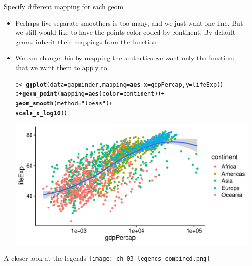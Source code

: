 \documentclass[10pt,handout]{beamer}\usepackage[]{graphicx}\usepackage[]{color}
\makeatletter
\def\maxwidth{ %
  \ifdim\Gin@nat@width>\linewidth
    \linewidth
  \else
    \Gin@nat@width
  \fi
}
\newcommand{\hlstr}[1]{\textcolor[rgb]{0.192,0.494,0.8}{#1}}%
\newcommand{\hlopt}[1]{\textcolor[rgb]{0,0,0}{#1}}%
\newcommand{\hlstd}[1]{\textcolor[rgb]{0.345,0.345,0.345}{#1}}%
\newcommand{\hlkwb}[1]{\textcolor[rgb]{0.69,0.353,0.396}{#1}}%
\newcommand{\hlkwc}[1]{\textcolor[rgb]{0.333,0.667,0.333}{#1}}%
\newcommand{\hlkwd}[1]{\textcolor[rgb]{0.737,0.353,0.396}{\textbf{#1}}}%
\newenvironment{kframe}{%
 \def\at@end@of@kframe{}%
 \ifinner\ifhmode%
  \def\at@end@of@kframe{\end{minipage}}%
  \begin{minipage}{\columnwidth}%
 \fi\fi%
 \def\FrameCommand##1{\hskip\@totalleftmargin \hskip-\fboxsep
 \colorbox{shadecolor}{##1}\hskip-\fboxsep
     \hskip-\linewidth \hskip-\@totalleftmargin \hskip\columnwidth}%
 \MakeFramed {\advance\hsize-\width
   \@totalleftmargin\z@ \linewidth\hsize
   \@setminipage}}%
 {\par\unskip\endMakeFramed%
 \at@end@of@kframe}
\newenvironment{knitrout}{}{} %
\makeatother
\begin{document}
\begin{frame}[fragile]{Specify different mapping for each geom}
	\small
	\begin{itemize}
		\item Perhaps five separate smoothers is too many, and we just want one line. But we still would like to have the points color-coded by continent. By default, geoms inherit their mappings from the  function \pause
		\item We can change this by mapping the aesthetics we want only the  functions that we want them to apply to.\pause
\begin{knitrout}\tiny
{}\color{fgcolor}\begin{kframe}
\begin{alltt}
\hlstd{p} \hlkwb{<-} \hlkwd{ggplot}\hlstd{(}\hlkwc{data} \hlstd{= gapminder,} \hlkwc{mapping} \hlstd{=} \hlkwd{aes}\hlstd{(}\hlkwc{x} \hlstd{= gdpPercap,} \hlkwc{y} \hlstd{= lifeExp))}
\hlstd{p} \hlopt{+} \hlkwd{geom_point}\hlstd{(}\hlkwc{mapping} \hlstd{=} \hlkwd{aes}\hlstd{(}\hlkwc{color} \hlstd{= continent))} \hlopt{+}
        \hlkwd{geom_smooth}\hlstd{(}\hlkwc{method} \hlstd{=} \hlstr{"loess"}\hlstd{)} \hlopt{+}
        \hlkwd{scale_x_log10}\hlstd{()}
\end{alltt}
\end{kframe}

{\centering \includegraphics[width=\maxwidth]{figure/unnamed-chunk-18-1} 

}


\end{knitrout}
\end{itemize}
	
\end{frame}


\begin{frame}{A closer look at the legends}
	\centering
	\texttt{[image: ch-03-legends-combined.png]}
\end{frame}
\end{document}
